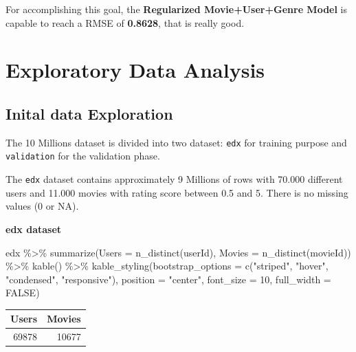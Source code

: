 \documentclass[
]{article}
\newenvironment{Shaded}{}{}
\newcommand{\AttributeTok}[1]{\textcolor[rgb]{0.49,0.56,0.16}{#1}}
\newcommand{\ConstantTok}[1]{\textcolor[rgb]{0.53,0.00,0.00}{#1}}
\newcommand{\DecValTok}[1]{\textcolor[rgb]{0.25,0.63,0.44}{#1}}
\newcommand{\FunctionTok}[1]{\textcolor[rgb]{0.02,0.16,0.49}{#1}}
\newcommand{\NormalTok}[1]{#1}
\newcommand{\SpecialCharTok}[1]{\textcolor[rgb]{0.25,0.44,0.63}{#1}}
\newcommand{\StringTok}[1]{\textcolor[rgb]{0.25,0.44,0.63}{#1}}
\begin{document}
For accomplishing this goal, the \textbf{Regularized Movie+User+Genre
Model} is capable to reach a RMSE of \textbf{0.8628}, that is really
good.

\hypertarget{exploratory-data-analysis}{%
\section{Exploratory Data Analysis}\label{exploratory-data-analysis}}

\hypertarget{inital-data-exploration}{%
\subsection{Inital data Exploration}\label{inital-data-exploration}}

The 10 Millions dataset is divided into two dataset: \texttt{edx} for
training purpose and \texttt{validation} for the validation phase.

The \texttt{edx} dataset contains approximately 9 Millions of rows with
70.000 different users and 11.000 movies with rating score between 0.5
and 5. There is no missing values (0 or NA).

\textbf{edx dataset}

\begin{Shaded}
\begin{Highlighting}[]
\NormalTok{edx }\SpecialCharTok{\%\textgreater{}\%} \FunctionTok{summarize}\NormalTok{(}\AttributeTok{Users =} \FunctionTok{n\_distinct}\NormalTok{(userId),}
              \AttributeTok{Movies =} \FunctionTok{n\_distinct}\NormalTok{(movieId)) }\SpecialCharTok{\%\textgreater{}\%} 
\FunctionTok{kable}\NormalTok{() }\SpecialCharTok{\%\textgreater{}\%}
   \FunctionTok{kable\_styling}\NormalTok{(}\AttributeTok{bootstrap\_options =} \FunctionTok{c}\NormalTok{(}\StringTok{"striped"}\NormalTok{, }\StringTok{"hover"}\NormalTok{, }\StringTok{"condensed"}\NormalTok{, }\StringTok{"responsive"}\NormalTok{),}
                 \AttributeTok{position =} \StringTok{"center"}\NormalTok{,}
                 \AttributeTok{font\_size =} \DecValTok{10}\NormalTok{,}
                 \AttributeTok{full\_width =} \ConstantTok{FALSE}\NormalTok{)}
\end{Highlighting}
\end{Shaded}

\begin{table}
\centering\begingroup\fontsize{10}{12}\selectfont

\begin{tabular}{r|r}
\hline
Users & Movies\\
\hline
69878 & 10677\\
\hline
\end{tabular}
\endgroup{}
\end{table}
\end{document}
